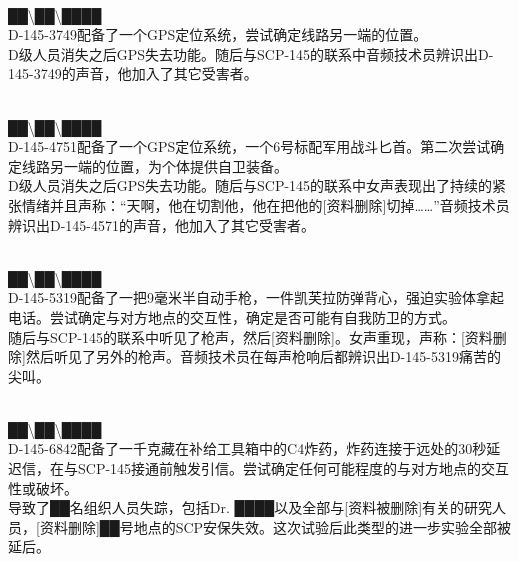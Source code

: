 \\
██\textbackslash ██\textbackslash ████\\
D-145-3749配备了一个GPS定位系统，尝试确定线路另一端的位置。\\
D级人员消失之后GPS失去功能。随后与SCP-145的联系中音频技术员辨识出D-145-3749的声音，他加入了其它受害者。

\\
██\textbackslash ██\textbackslash ████\\
D-145-4751配备了一个GPS定位系统，一个6号标配军用战斗匕首。第二次尝试确定线路另一端的位置，为个体提供自卫装备。\\
D级人员消失之后GPS失去功能。随后与SCP-145的联系中女声表现出了持续的紧张情绪并且声称：“天啊，他在切割他，他在把他的{[}资料删除]切掉……”音频技术员辨识出D-145-4571的声音，他加入了其它受害者。

\\
██\textbackslash ██\textbackslash ████\\
D-145-5319配备了一把9毫米半自动手枪，一件凯芙拉防弹背心，强迫实验体拿起电话。尝试确定与对方地点的交互性，确定是否可能有自我防卫的方式。\\
随后与SCP-145的联系中听见了枪声，然后{[}资料删除]。女声重现，声称：{[}资料删除]然后听见了另外的枪声。音频技术员在每声枪响后都辨识出D-145-5319痛苦的尖叫。

\\
██\textbackslash ██\textbackslash ████\\
D-145-6842配备了一千克藏在补给工具箱中的C4炸药，炸药连接于远处的30秒延迟信，在与SCP-145接通前触发引信。尝试确定任何可能程度的与对方地点的交互性或破坏。\\
导致了██名组织人员失踪，包括Dr. ████以及全部与{[}资料被删除]有关的研究人员，{[}资料删除]██号地点的SCP安保失效。这次试验后此类型的进一步实验全部被延后。

